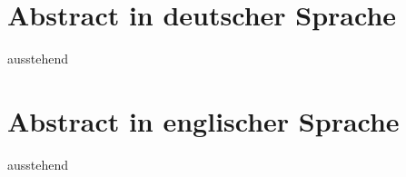 \section*{Abstract in deutscher Sprache}

ausstehend

\acresetall{}

\newpage \section*{Abstract in englischer Sprache}

ausstehend

\acresetall{}
